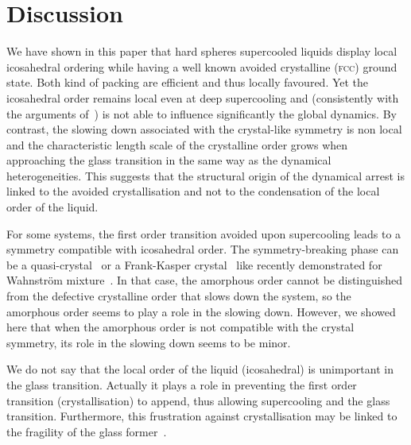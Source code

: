 \documentclass{revtex4-1}
\begin{document}
\section*{Discussion}

We have shown in this paper that hard spheres supercooled liquids display local icosahedral ordering while having a well known avoided crystalline (\textsc{fcc}) ground state. Both kind of packing are efficient and thus locally favoured. Yet the icosahedral order remains local even at deep supercooling and (consistently with the arguments of~\citep{Berthier2007}) is not able to influence significantly the global dynamics. By contrast, the slowing down associated with the crystal-like symmetry is non local and the characteristic length scale of the crystalline order grows when approaching the glass transition in the same way as the dynamical heterogeneities. This suggests that the structural origin of the dynamical arrest is linked to the avoided crystallisation and not to the condensation of the local order of the liquid.

For some systems, the first order transition avoided upon supercooling leads to a symmetry compatible with icosahedral order. The symmetry-breaking phase can be a quasi-crystal~\citep{Dzugutov1993} or a Frank-Kasper crystal~\citep{Frank1959,Frank1958} like recently demonstrated for Wahnstr\"om mixture~\citep{Pedersen2010}. In that case, the amorphous order cannot be distinguished from the defective crystalline order that slows down the system, so the amorphous order seems to play a role in the slowing down. However, we showed here that when the amorphous order is not compatible with the crystal symmetry, its role in the slowing down seems to be minor.

We do not say that the local order of the liquid (icosahedral) is unimportant in the glass transition. Actually it plays a role in preventing the first order transition (crystallisation) to append, thus allowing supercooling and the glass transition. Furthermore, this frustration against crystallisation may be linked to the fragility of the glass former~\citep{tanaka1999top}.



\end{document}
